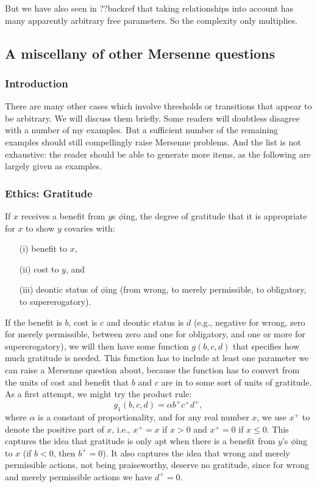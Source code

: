 But we have also seen in ??backref that taking relationships into account has many apparently arbitrary free parameters. So 
the complexity only multiplies.


\subsection{A miscellany of other Mersenne questions}
\subsubsection{Introduction}
There are many other cases which involve thresholds or transitions that appear to be arbitrary. We will discuss them briefly.
Some readers will doubtless disagree with a number of my examples. But a sufficient number of the remaining examples 
should still compellingly raise Mersenne problems. And the list is not
exhaustive: the reader should be able to generate more items, as the following are largely given as examples.

\subsubsection{Ethics: Gratitude}
If $x$ receives a benefit from $y$s $\phi$ing, the degree of gratitude that it is
appropriate for $x$ to show $y$ covaries with:
\begin{enumerate}
\item[(i)] benefit to $x$,
\item[(ii)] cost to $y$, and
\item[(iii)] deontic status of $\phi$ing (from wrong, to merely permissible, to obligatory, to supererogatory).
\end{enumerate}

If the benefit is $b$, cost is $c$ and deontic status is $d$ (e.g., negative for wrong, zero for merely
permissible, between zero and one for obligatory, and one or more for supererogatory), we will then have 
some function $g(b,c,d)$ that specifies how much gratitude is needed. This function has to include at least
one parameter we can raise a Mersenne question about, because the function has to convert from the units
of cost and benefit that $b$ and $c$ are in to some sort of units of gratitude. As a first
attempt, we might try the product rule:
$$
	g_1(b,c,d)=\alpha b^+ c^+ d^+,
$$	
where $\alpha$ is a constant of proportionality, and for any real
number $x$, we use $x^+$ to denote the positive part of $x$, i.e., $x^+=x$ if $x>0$ and $x^+=0$ if $x\le 0$.
This captures the idea that gratitude is only apt when there is a benefit from $y$'s $\phi$ing to $x$ (if $b<0$, 
then $b^+=0$). It also captures the idea that wrong and merely permissible actions, not being praiseworthy,
deserve no gratitude, since for wrong and merely permissible actions we have $d^+=0$.

